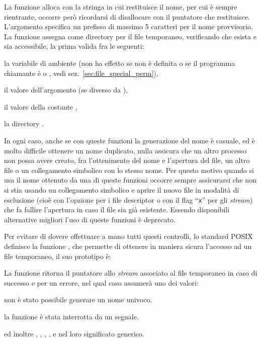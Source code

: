 La funzione alloca con  la stringa in cui restituisce il nome,
per cui è sempre rientrante, occorre però ricordarsi di disallocare con
 il puntatore che restituisce.  L'argomento  specifica
un prefisso di massimo 5 caratteri per il nome provvisorio. La funzione
assegna come directory per il file temporaneo, verificando che esista e sia
accessibile, la prima valida fra le seguenti:
\begin{itemize*}
\item la variabile di ambiente  (non ha effetto se non è
  definita o se il programma chiamante è  o , vedi
  sez.~\ref{sec:file_special_perm}),
\item il valore dell'argomento  (se diverso da ),
\item il valore della costante ,
\item la directory .
\end{itemize*}

In ogni caso, anche se con queste funzioni la generazione del nome è casuale,
ed è molto difficile ottenere un nome duplicato, nulla assicura che un altro
processo non possa avere creato, fra l'ottenimento del nome e l'apertura del
file, un altro file o un collegamento simbolico con lo stesso nome. Per questo
motivo quando si usa il nome ottenuto da una di queste funzioni occorre sempre
assicurarsi che non si stia usando un collegamento simbolico e aprire il nuovo
file in modalità di esclusione (cioè con l'opzione  per i file
descriptor o con il flag ``\texttt{x}'' per gli \textit{stream}) che fa
fallire l'apertura in caso il file sia già esistente. Essendo disponibili
alternative migliori l'uso di queste funzioni è deprecato.

Per evitare di dovere effettuare a mano tutti questi controlli, lo standard
POSIX definisce la funzione , che permette di ottenere in
maniera sicura l'accesso ad un file temporaneo, il suo prototipo è:

\begin{funcproto}{
}
{La funzione ritorna il puntatore allo \textit{stream} associato al file
  temporaneo in caso di successo e  per un errore, nel qual caso
   assumerà uno dei valori:
  \begin{errlist}
    \item[\errcode{EEXIST}] non è stato possibile generare un nome univoco.
    \item[\errcode{EINTR}] la funzione è stata interrotta da un segnale.
  \end{errlist}
  ed inoltre , , ,
  ,  e  nel loro significato
  generico.}
\end{funcproto}


